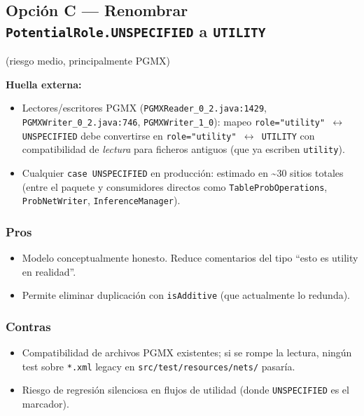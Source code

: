 \documentclass[11pt,a4paper]{article}
\newcommand{\code}[1]{\texttt{#1}}
\begin{document}
\subsection{Opción C --- Renombrar \code{PotentialRole.UNSPECIFIED} a
\code{UTILITY}} (riesgo medio, principalmente PGMX)

\textbf{Huella externa:}

\begin{itemize}[leftmargin=*]
  \item Lectores/escritores PGMX (\code{PGMXReader\_0\_2.java:1429},
        \code{PGMXWriter\_0\_2.java:746}, \code{PGMXWriter\_1\_0}): mapeo
        \code{role="utility" $\leftrightarrow$ UNSPECIFIED} debe convertirse
        en \code{role="utility" $\leftrightarrow$ UTILITY} con compatibilidad
        de \emph{lectura} para ficheros antiguos (que ya escriben
        \code{utility}).
  \item Cualquier \code{case UNSPECIFIED} en producción: estimado en
        \textasciitilde 30 sitios totales (entre el paquete y consumidores
        directos como \code{TableProb\-Operations}, \code{ProbNetWriter},
        \code{InferenceManager}).
\end{itemize}

\subsubsection*{Pros}
\begin{itemize}[leftmargin=*]
  \item Modelo conceptualmente honesto. Reduce comentarios del tipo ``esto
        es utility en realidad''.
  \item Permite eliminar duplicación con \code{isAdditive} (que actualmente
        lo redunda).
\end{itemize}

\subsubsection*{Contras}
\begin{itemize}[leftmargin=*]
  \item Compatibilidad de archivos PGMX existentes; si se rompe la lectura,
        ningún test sobre \code{*.xml} legacy en
        \code{src/test/resources/nets/} pasaría.
  \item Riesgo de regresión silenciosa en flujos de utilidad (donde
        \code{UNSPECIFIED} es el marcador).
\end{itemize}
\end{document}

